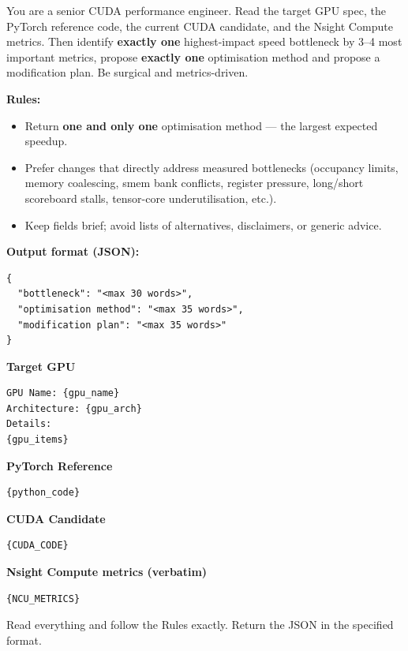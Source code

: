 \begin{tcolorbox}[mybox, title={Prompt for CUDA Kernel Optimization}]
\ttfamily 

You are a senior CUDA performance engineer. Read the target GPU spec, the PyTorch
reference code, the current CUDA candidate, and the Nsight Compute metrics. Then identify \textbf{exactly one} highest-impact speed bottleneck by 3--4 most important metrics, propose \textbf{exactly one} optimisation method and propose a modification plan. Be surgical and metrics-driven.

\medskip
\textbf{Rules:}
\begin{itemize}
  \item Return \textbf{one and only one} optimisation method --- the largest expected speedup.
  \item Prefer changes that directly address measured bottlenecks (occupancy limits,
        memory coalescing, smem bank conflicts, register pressure, long/short scoreboard
        stalls, tensor-core underutilisation, etc.).
  \item Keep fields brief; avoid lists of alternatives, disclaimers, or generic advice.
\end{itemize}

\medskip
\textbf{Output format (JSON):}
\begin{tcolorbox}[colback=white, colframe=gray!50, left=2mm, right=2mm, top=1mm, bottom=1mm]
\footnotesize
\begin{verbatim}
{
  "bottleneck": "<max 30 words>",
  "optimisation method": "<max 35 words>",
  "modification plan": "<max 35 words>"
}
\end{verbatim}
\end{tcolorbox}

\medskip
\textbf{Target GPU}
\begin{verbatim}
GPU Name: {gpu_name}
Architecture: {gpu_arch}
Details:
{gpu_items}
\end{verbatim}

\textbf{PyTorch Reference}
\begin{verbatim}
{python_code}
\end{verbatim}

\textbf{CUDA Candidate}
\begin{verbatim}
{CUDA_CODE}
\end{verbatim}

\textbf{Nsight Compute metrics (verbatim)}
\begin{verbatim}
{NCU_METRICS}
\end{verbatim}

Read everything and follow the Rules exactly. Return the JSON in the specified format.

\normalfont %
\end{tcolorbox}






